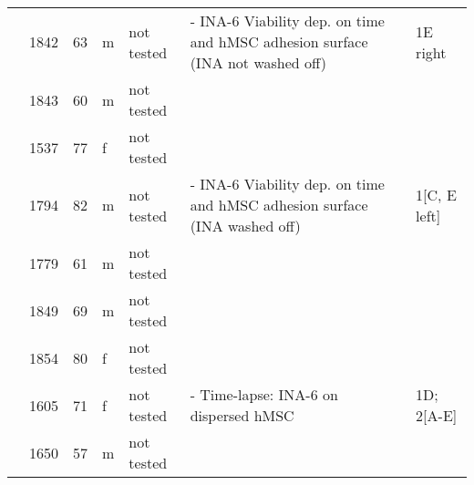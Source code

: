 {\begin{longtable}{|p{1.5cm}|p{1cm}|p{1cm}|p{1cm}|p{2cm}|p{6cm}|p{1.7cm}|}
                           & 1842                  & 63                  & m                  & not tested                                & - INA-6 Viability dep. on time and hMSC adhesion surface (INA not washed off)                            & 1E right           \\
                           & 1843                  & 60                  & m                  & not tested                                &                                                                                                          &                    \\
                           & 1537                  & 77                  & f                  & not tested                                &                                                                                                          &                    \\
                           & 1794                  & 82                  & m                  & not tested                                & - INA-6 Viability dep. on time and hMSC adhesion surface (INA washed off)                                & 1[C, E left]       \\
                           & 1779                  & 61                  & m                  & not tested                                &                                                                                                          &                    \\
                           & 1849                  & 69                  & m                  & not tested                                &                                                                                                          &                    \\
                           & 1854                  & 80                  & f                  & not tested                                &                                                                                                          &                    \\
                           & 1605                  & 71                  & f                  & not tested                                & - Time-lapse: INA-6 on dispersed hMSC                                                                    & 1D; 2[A-E]         \\
                           & 1650                  & 57                  & m                  & not tested                                &                                                                                                          &                    \\

\end{longtable}}
